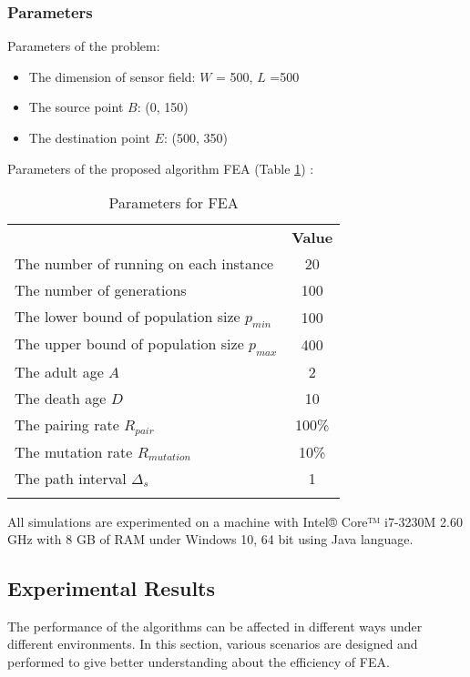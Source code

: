\documentclass[final]{elsarticle}
\begin{document}
\subsubsection{Parameters}
Parameters of the problem:
\begin{itemize}
	\item The dimension of sensor field: $ W $ = 500, $ L $ =500
	\item The source point $ B $: (0, 150) 
	\item The destination point $ E $: (500, 350)	
\end{itemize}
Parameters of the proposed algorithm FEA (Table \ref{tab1}) :
\begin{table}
	\caption{Parameters for FEA}
	\label{tab1}       %
	\begin{center}
		\renewcommand{\arraystretch}{1.5}
		\begin{tabular}{lc}
			\hline\noalign{\smallskip}
			\multicolumn{1}{c}{\textbf{Parameter}} & \textbf{Value} \\
			\noalign{\smallskip}\hline\noalign{\smallskip}
			The number of running on each instance & 20 \\
			The number of generations & 100\\
			The lower bound of population size $ p_{min} $ & 100\\
			The upper bound of population size $ p_{max} $ & 400\\
			The adult age $A$ & 2 \\
			The death age $D$ & 10 \\
			The pairing rate $ R_{pair}$  & 100\% \\
			The mutation rate $ R_{mutation} $ & 10\% \\
			The path interval $\Delta_s$ & 1 \\ 
			\noalign{\smallskip} \hline
		\end{tabular}
	\end{center}
\end{table}
All simulations are experimented on a machine with Intel® Core™ i7-3230M 2.60 GHz with 8 GB of RAM under Windows 10, 64 bit using Java language.

\subsection{Experimental Results}
The performance of the algorithms can be affected in different ways under different environments. In this section, various scenarios are designed and performed to give better understanding about the efficiency of FEA.
\end{document}
